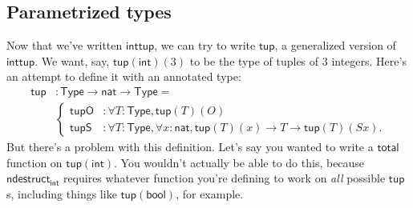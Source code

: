 \documentclass[11pt,paper=letter]{scrartcl}
\renewcommand{\sf}{\mathsf}
\newcommand{\type}{\mathsf{Type}}
\begin{document}
\subsection{Parametrized types}

Now that we've written $\sf{inttup}$, we can try to write $\sf{tup}$, a generalized version of $\sf{inttup}$. We want, say, $\sf{tup}(\sf{int})(3)$ to be the type of tuples of $3$ integers. Here's an attempt to define it with an annotated type:
\begin{align*}
\sf{tup}&: \type \to \sf{nat} \to \type =\\
&\begin{cases}
\sf{tupO}&: \forall T: \type, \sf{tup}(T)(O) \\
\sf{tupS}&: \forall T: \type, \forall x: \sf{nat}, \sf{tup}(T)(x) \to T \to \sf{tup}(T)(Sx).
\end{cases}
\end{align*}
But there's a problem with this definition. Let's say you wanted to write a $\sf{total}$ function on $\sf{tup}(\sf{int})$. You wouldn't actually be able to do this, because $\sf{ndestruct}_{\sf{int}}$ requires whatever function you're defining to work on \emph{all} possible $\sf{tup}$s, including things like $\sf{tup}(\sf{bool})$, for example.
\end{document}
